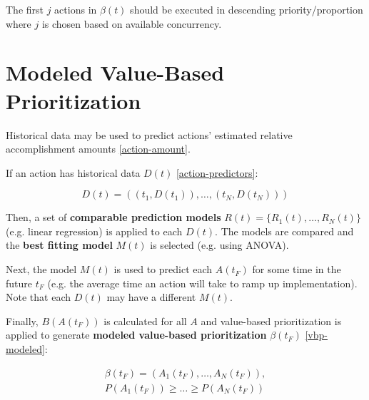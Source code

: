 \documentclass[12pt, a4paper, twocolumn]{article}
\begin{document}
The first $j$ actions in $\beta(t)$ should be executed in descending priority/proportion where $j$ is chosen based on available concurrency.

\section{Modeled Value-Based Prioritization}

Historical data may be used to predict actions' estimated relative accomplishment amounts \eqref{action-amount}.

If an action has historical data $D(t)$ \eqref{action-predictors}:

\begin{equation}\label{action-predictors}
D(t) = ((t_1, D(t_1)), \ldots, (t_N, D(t_N)))
\end{equation}

Then, a set of \textbf{comparable prediction models} $R(t) = \{R_1(t), \ldots, R_N(t)\}$ (e.g. linear regression) is applied to each $D(t)$. The models are compared and the \textbf{best fitting model} $M(t)$ is selected (e.g. using ANOVA).

Next, the model $M(t)$ is used to predict each $A(t_F)$ for some time in the future $t_F$ (e.g. the average time an action will take to ramp up implementation). Note that each $D(t)$ may have a different $M(t)$.

Finally, $B(A(t_F))$ is calculated for all $A$ and value-based prioritization is applied to generate \textbf{modeled value-based prioritization} $\beta(t_F)$ \eqref{vbp-modeled}:

\begin{equation}\label{vbp-modeled}
  \begin{gathered}
\beta(t_F) = (A_1(t_F), \ldots, A_N(t_F)), \\
P(A_1(t_F)) \geq \ldots \geq P(A_N(t_F))
  \end{gathered}
\end{equation}


\nocite{*}


\end{document}
